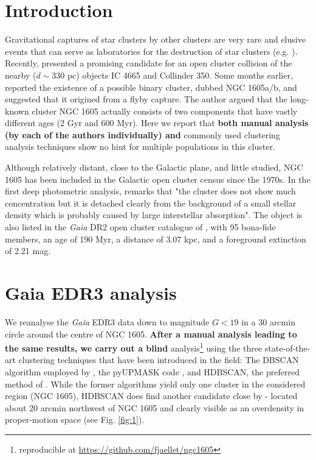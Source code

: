 \documentclass[RNAAS]{aastex631}
\begin{document}
\section{Introduction}
Gravitational captures of star clusters by other clusters are very rare and elusive events that can serve as laboratories for the destruction of star clusters (e.g. \citealt{Soubiran2018, Casado2022}). Recently, \citet{Piatti2022} presented a promising candidate for an open cluster collision of the nearby ($d\sim330$ pc) objects IC 4665 and Collinder 350.
Some months earlier, \citet{Camargo2021} reported the existence of a possible binary cluster, dubbed NGC 1605a/b, and suggested that it origined from a flyby capture. The author argued that the long-known cluster NGC 1605 actually consists of two components that have vastly different ages (2 Gyr and 600 Myr). Here we report that {\bf both manual analysis (by each of the authors individually) and} commonly used clustering analysis techniques show no hint for multiple populations in this cluster.

Although relatively distant, close to the Galactic plane, and little studied, NGC 1605 has been included in the Galactic open cluster census since the 1970s. In the first deep photometric analysis, \citet{Fang1970} remarks that "the cluster does not show much concentration but it is detached clearly from the background of a small stellar density which is probably caused by large interstellar absorption". %
The object is also listed in the {\it Gaia} DR2 open cluster catalogue of \citet{Cantat2020}, with 95 bona-fide members, an age of 190 Myr, a distance of 3.07 kpc, and a foreground extinction of 2.21 mag.

\section{Gaia EDR3 analysis}
We reanalyse the {\it Gaia} EDR3 data \citep{Gaia2021} down to magnitude $G<19$ in a 30 arcmin circle around the centre of NGC 1605. {\bf After a manual analysis leading to the same results, we carry out a blind} analysis\footnote{reproducible at \url{https://github.com/fjaellet/ngc1605}} using the three state-of-the-art clustering techniques that have been introduced in the field: The DBSCAN algorithm employed by \citet{Castro2022}, the pyUPMASK code \citep{Pera2021}, and HDBSCAN, the preferred method of \citet{Hunt2021}. 
While the former algorithms yield only one cluster in the considered region (NGC 1605), HDBSCAN does find another candidate close by - located about 20 arcmin northwest of NGC 1605 and clearly visible as an overdensity in proper-motion space (see Fig. \ref{fig:1}).
\end{document}

